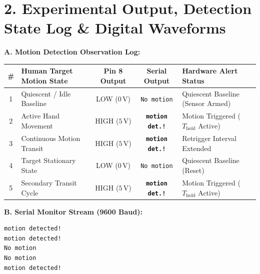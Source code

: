 \documentclass[11pt,a4paper]{article}
\begin{document}
\section*{2. Experimental Output, Detection State Log \& Digital Waveforms}

\noindent
\textbf{A. Motion Detection Observation Log:}\par\vspace{0.06cm}
{\footnotesize
\setlength{\tabcolsep}{4.5pt}
\renewcommand{\arraystretch}{1.18}
\begin{tabularx}{\textwidth}{|c|p{4.6cm}|c|c|X|}
\hline
\textbf{\#} & \textbf{Human Target Motion State} & \textbf{Pin 8 Output} & \textbf{Serial Output} & \textbf{Hardware Alert Status} \\
\hline
1 & Quiescent / Idle Baseline & LOW ($0\,\text{V}$) & \texttt{No motion} & Quiescent Baseline (Sensor Armed) \\
2 & Active Hand Movement & HIGH ($5\,\text{V}$) & \textbf{\texttt{motion det.!}} & Motion Triggered ($T_{\text{hold}}$ Active) \\
3 & Continuous Motion Transit & HIGH ($5\,\text{V}$) & \textbf{\texttt{motion det.!}} & Retrigger Interval Extended \\
4 & Target Stationary State & LOW ($0\,\text{V}$) & \texttt{No motion} & Quiescent Baseline (Reset) \\
5 & Secondary Transit Cycle & HIGH ($5\,\text{V}$) & \textbf{\texttt{motion det.!}} & Motion Triggered ($T_{\text{hold}}$ Active) \\
\hline
\end{tabularx}
}

\vspace{0.20cm}

\noindent
\textbf{B. Serial Monitor Stream (9600 Baud):}\par\vspace{0.05cm}
\begin{lstlisting}[style=bwTerminal]
motion detected!
motion detected!
No motion
No motion
motion detected!
\end{lstlisting}

\vspace{0.18cm}
\end{document}
